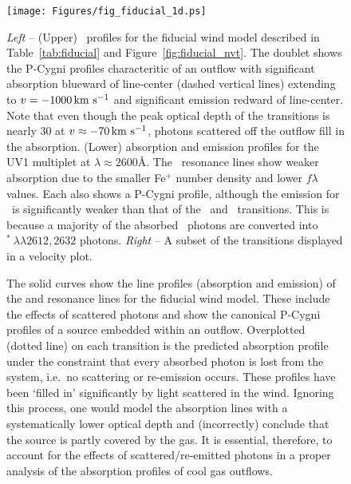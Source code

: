 \documentclass[12pt,preprint]{aastex}
\begin{document}
\begin{figure}
\texttt{[image: Figures/fig\_fiducial\_1d.ps]}
\caption{
{\it Left} -- (Upper) \mgiid\ profiles for the fiducial wind model
described in Table~\ref{tab:fiducial} and
Figure~\ref{fig:fiducial_nvt}.  The doublet shows the P-Cygni profiles
characteritic of an outflow with significant absorption blueward of
line-center (dashed vertical lines) extending to $v = -1000\, {\rm km~s^{-1}}$
and significant emission redward of line-center.  Note
that even though the peak optical depth of the  transitions
is nearly 30 at $v \approx -70 \, {\rm km~s^{-1}}$, photons scattered off the outflow
fill in the absorption.
(Lower)  absorption and emission profiles for the UV1
multiplet at $\lambda \approx 2600$\AA.  The \feiid\ resonance lines 
show weaker absorption due to the smaller Fe$^+$ number density and
lower $f\lambda$ values.  Each also shows a P-Cygni profile, although
the emission for \feiia\ is significantly weaker than that of the
\feiib\ and \mgiid\ transitions.  This is because a majority of the
absorbed \feiia\ photons are converted into
$^*~\lambda\lambda 2612, 2632$ photons.
{\it Right} -- A subset of the transitions displayed in a velocity
plot.
}
\label{fig:fiducial_1d}
\end{figure}

\begin{figure}
\caption{
The solid curves show the line profiles (absorption and emission) of
the  and  resonance lines for the fiducial wind
model.  These include the effects of scattered photons and show the
canonical P-Cygni profiles of a source 
embedded within an outflow.  Overplotted (dotted line) on each transition is
the predicted absorption profile under the constraint that every
absorbed photon is lost from the system, i.e.\ no scattering or
re-emission occurs.   These profiles have been `filled
in' significantly by light scattered in the wind.  Ignoring this
process, one would model the absorption lines with a systematically lower
optical depth and (incorrectly) conclude that the source is partly covered by the
gas.  It is essential, therefore, to account for the effects of
scattered/re-emitted photons in a proper analysis of the absorption
profiles of cool gas outflows.
}
\label{fig:noemiss}
\end{figure}
\end{document}

